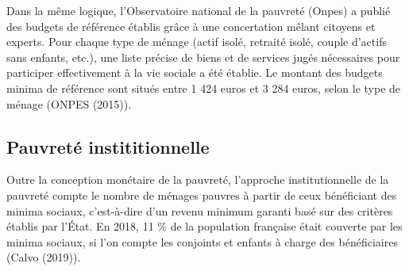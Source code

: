 \documentclass[12pt,a4paper]{reedthesis}
\begin{document}
Dans la même logique, l'Observatoire national de la pauvreté (Onpes) a publié des budgets de référence établis grâce à une concertation mêlant citoyens et experts. Pour chaque type de ménage (actif isolé, retraité isolé, couple d'actifs sans enfants, etc.), une liste précise de biens et de services jugés nécessaires pour participer effectivement à la vie sociale a été établie. Le montant des budgets minima de référence sont situés entre 1 424 euros et 3 284 euros, selon le type de ménage (ONPES (2015)).

\hypertarget{sec:institutionnelle}{%
\subsection{Pauvreté instititionnelle}\label{sec:institutionnelle}}

Outre la conception monétaire de la pauvreté, l'approche institutionnelle de la pauvreté compte le nombre de ménages pauvres à partir de ceux bénéficiant des minima sociaux, c'est-à-dire d'un revenu minimum garanti basé sur des critères établis par l'État. En 2018, 11 \% de la population française était couverte par les minima sociaux, si l'on compte les conjoints et enfants à charge des bénéficiaires (Calvo (2019)).
\end{document}
